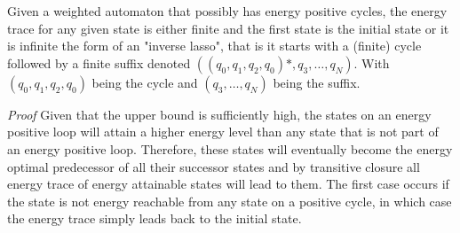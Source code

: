 \documentclass{rapport}
\begin{document}
\begin{theorem}
Given a weighted automaton that possibly has energy positive cycles,
the energy trace for any given state is either finite and the first state is the
initial state or it is infinite the form of an "inverse lasso", that is
it starts with a (finite) cycle followed by a finite suffix denoted
$((q_0, q_1, q_2, q_0)*, q_3, \ldots, q_N)$.
With $(q_0, q_1, q_2, q_0)$ being the cycle and $(q_3, \ldots, q_N)$ being the suffix.
\end{theorem}

\textit{Proof}
Given that the upper bound is sufficiently high, the states on an energy positive
loop will attain a higher energy level than any state that is not part of an
energy positive loop. Therefore, these states will eventually become the
energy optimal predecessor of all their successor states and by transitive closure
all energy trace of energy attainable states will lead to them.
The first case occurs if the state is not energy reachable from any state on
a positive cycle, in which case the energy trace simply leads back to the
initial state.
\end{document}
